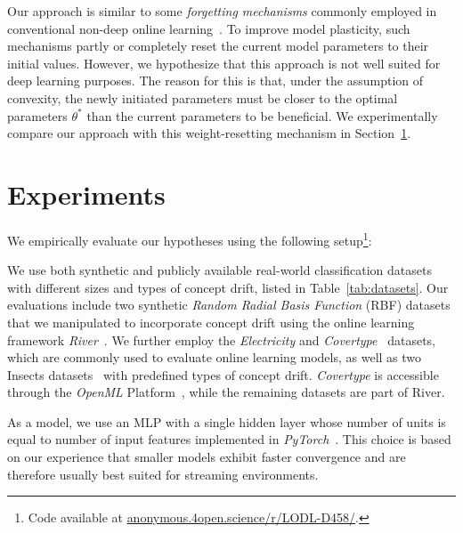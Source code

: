 \documentclass[runningheads]{llncs}
\begin{document}
Our approach is similar to some \textit{forgetting mechanisms} commonly employed in conventional non-deep online learning~\cite{gamaSurveyConceptDrift2014}.
To improve model plasticity, such mechanisms partly or completely reset the current model parameters to their initial values.
However, we hypothesize that this approach is not well suited for deep learning purposes.
The reason for this is that, under the assumption of convexity, the newly initiated parameters must be closer to the optimal parameters $\theta^*$ than the current parameters to be beneficial.
We experimentally compare our approach with this weight-resetting mechanism in Section~\ref{sec:experiments}.

\section{Experiments}\label{sec:experiments}

We empirically evaluate our hypotheses using the following setup\footnote[2]{Code available at \url{anonymous.4open.science/r/LODL-D458/}.}:

We use both synthetic and publicly available real-world classification datasets with different sizes and types of concept drift, listed in Table~\ref{tab:datasets}.
Our evaluations include two synthetic \textit{Random Radial Basis Function} (RBF) datasets that we manipulated to incorporate concept drift using the online learning framework \textit{River}~\cite{montiel2021river}.
We further employ the \textit{Electricity} and \textit{Covertype}~\cite{misc_covertype_31} datasets, which are commonly used to evaluate online learning models, as well as two Insects datasets~\cite{souzaChallengesBenchmarkingStream2020} with predefined types of concept drift.
\textit{Covertype} is accessible through the \textit{OpenML} Platform~\cite{vanschorenOpenMLNetworkedScience2014}, while the remaining datasets are part of River.

As a model, we use an MLP with a single hidden layer whose number of units is equal to number of input features implemented in \textit{PyTorch}~\cite{paszkePyTorchImperativeStyle2019}.
This choice is based on our experience that smaller models exhibit faster convergence and are therefore usually best suited for streaming environments.
\end{document}
